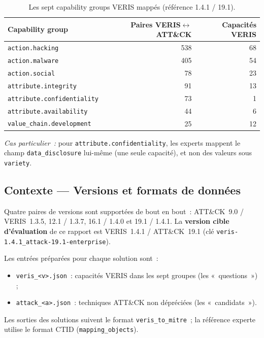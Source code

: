 \documentclass[a4paper,12pt]{article}
\begin{document}
\begin{table}[H]
  \centering
  \begin{tabular}{l r r}
    \toprule
    \textbf{Capability group} & \textbf{Paires VERIS$\leftrightarrow$ATT\&CK} & \textbf{Capacités VERIS} \\
    \midrule
    \texttt{action.hacking}            & 538 & 68 \\
    \texttt{action.malware}              & 405 & 54 \\
    \texttt{action.social}             &  78 & 23 \\
    \texttt{attribute.integrity}       &  91 & 13 \\
    \texttt{attribute.confidentiality} &  73 &  1 \\
    \texttt{attribute.availability}    &  44 &  6 \\
    \texttt{value\_chain.development}  &  25 & 12 \\
    \bottomrule
  \end{tabular}
  \caption{Les sept capability groups VERIS mappés (référence 1.4.1 / 19.1).}
  \label{tab:capability-groups}
\end{table}

\noindent
\textit{Cas particulier~:} pour \texttt{attribute.confidentiality}, les experts mappent
le champ \texttt{data\_disclosure} lui-même (une seule capacité), et non des valeurs
sous \texttt{variety}.

\subsection{Contexte --- Versions et formats de données}
\label{sec:contexte-formats}

Quatre paires de versions sont supportées de bout en bout~: 
ATT\&CK~9.0 / VERIS~1.3.5,
12.1 / 1.3.7,
16.1 / 1.4.0 
et 19.1 / 1.4.1. \newline
La \textbf{version cible d'évaluation}
de ce rapport est VERIS~1.4.1 / ATT\&CK~19.1 (clé
\texttt{veris-1.4.1\_attack-19.1-enterprise}).

Les entrées préparées pour chaque solution sont~:
\begin{itemize}
    \item \texttt{veris\_<v>.json}~: capacités VERIS dans les sept groupes (les «~questions~») ;
    \item \texttt{attack\_<a>.json}~: techniques ATT\&CK non dépréciées (les «~candidats~»).
\end{itemize}
Les sorties des solutions suivent le format \texttt{veris\_to\_mitre}~; la référence
experte utilise le format CTID (\texttt{mapping\_objects}).
\end{document}
